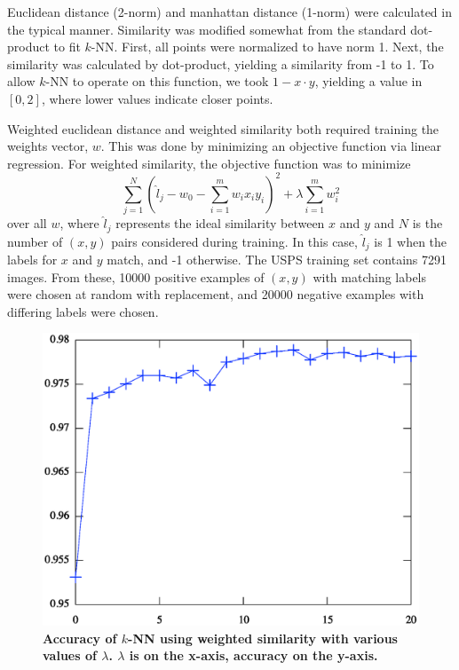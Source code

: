 \documentclass[12pt]{amsart}
\begin{document}
Euclidean distance (2-norm) and manhattan distance (1-norm) were calculated in the typical manner. Similarity was modified somewhat from the standard dot-product to fit $k$-NN. First, all points were normalized to have norm 1. Next, the similarity was calculated by dot-product, yielding a similarity from -1 to 1. To allow $k$-NN to operate on this function, we took $1-x\cdot y$, yielding a value in $[0,2]$, where lower values indicate closer points.

Weighted euclidean distance and weighted similarity both required training the weights vector, $w$. This was done by minimizing an objective function via linear regression. 
For weighted similarity, the objective function was to minimize
\[ \sum_{j=1}^N \left( \hat{l}_j - w_0 - \sum_{i=1}^m w_i x_i y_i  \right) ^2  + \lambda \sum_{i=1}^m w_i^2 \]
over all $w$, where $\hat{l}_j$ represents the ideal similarity between $x$ and $y$ and $N$ is the number of $(x,y)$ pairs considered during training. In this case, $\hat{l}_j$ is 1 when the labels for $x$ and $y$ match, and -1 otherwise. The USPS training set contains 7291 images. From these, 10000 positive examples of $(x,y)$ with matching labels were chosen at random with replacement, and 20000 negative examples with differing labels were chosen.

   \begin{figure}[htbp]
\begin{center}
\includegraphics[scale=.5]{weightedSimilarityAccuracy}
\caption{{\bf Accuracy of $k$-NN using weighted similarity with various values of $\lambda$. $\lambda$ is on the x-axis, accuracy on the y-axis.}}
\label{fig:lambda}
\end{center}
\end{figure}
\end{document}
